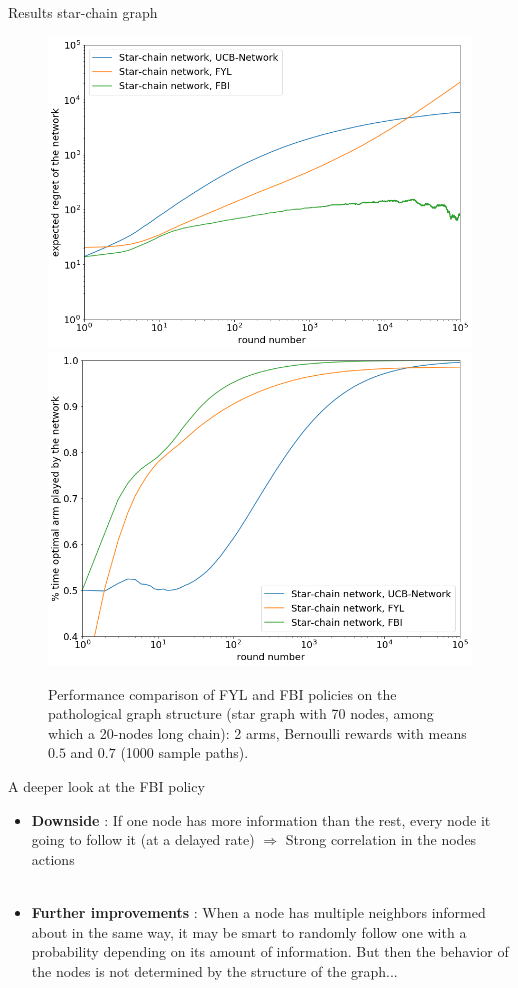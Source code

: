 \documentclass{beamer}
\begin{document}
\begin{frame}{Results star-chain graph}
\begin{figure}[H]
  \centering
  \includegraphics[width=0.49\linewidth]{fig5_1.png}
  \includegraphics[width=0.49\linewidth]{fig5_2.png}
  \caption{\centering Performance comparison of FYL and FBI policies on the pathological graph structure (star graph with 70 nodes, among which a 20-nodes long chain): 2 arms, Bernoulli rewards with means $0.5$ and $0.7$ (1000 sample paths).}
\end{figure}
\end{frame}

\begin{frame}{A deeper look at the FBI policy}
\begin{itemize}
\item \textbf{Downside} : If one node has more information than the rest, every node it going to follow it (at a delayed rate) $\Rightarrow$ \alert{Strong correlation in the nodes actions} \\ ~ \\


\item \textbf{Further improvements} : When a node has multiple neighbors informed about in the same way, it may be smart to randomly follow one with a \alert{probability depending on its amount of information}. But then the behavior of the nodes is not determined by the structure of the graph...
\end{itemize}
\end{frame}
\end{document}
